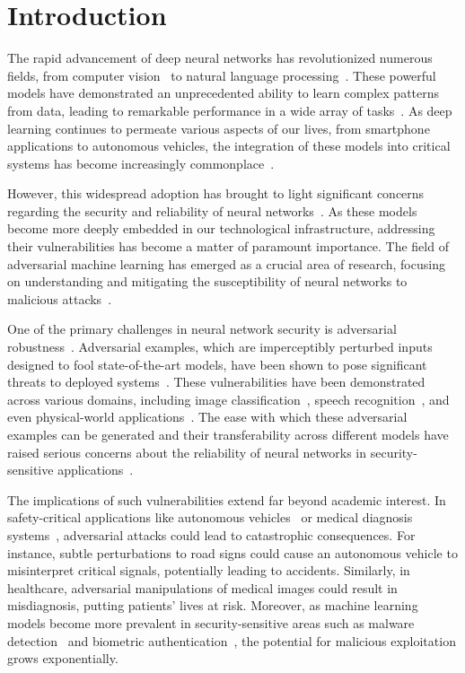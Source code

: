 \section{Introduction}\label{sec:introduction}
The rapid advancement of deep neural networks has revolutionized numerous fields, from computer vision~\cite{krizhevsky2012imagenet} to natural language processing~\cite{devlin2018bert}.
These powerful models have demonstrated an unprecedented ability to learn complex patterns from data, leading to remarkable performance in a wide array of tasks~\cite{lecun2015deep}.
As deep learning continues to permeate various aspects of our lives, from smartphone applications to autonomous vehicles, the integration of these models into critical systems has become increasingly commonplace~\cite{goodfellow2016deep}.

However, this widespread adoption has brought to light significant concerns regarding the security and reliability of neural networks~\cite{biggio2018wild}.
As these models become more deeply embedded in our technological infrastructure, addressing their vulnerabilities has become a matter of paramount importance.
The field of adversarial machine learning has emerged as a crucial area of research, focusing on understanding and mitigating the susceptibility of neural networks to malicious attacks~\cite{vorobeychik2018adversarial}.

One of the primary challenges in neural network security is adversarial robustness~\cite{szegedy2013intriguing}.
Adversarial examples, which are imperceptibly perturbed inputs designed to fool state-of-the-art models, have been shown to pose significant threats to deployed systems~\cite{goodfellow2014explaining}.
These vulnerabilities have been demonstrated across various domains, including image classification~\cite{carlini2017towards}, speech recognition~\cite{carlini2018audio}, and even physical-world applications~\cite{kurakin2016adversarial}.
The ease with which these adversarial examples can be generated and their transferability across different models have raised serious concerns about the reliability of neural networks in security-sensitive applications~\cite{papernot2016transferability}.

The implications of such vulnerabilities extend far beyond academic interest.
In safety-critical applications like autonomous vehicles~\cite{eykholt2018robust} or medical diagnosis systems~\cite{finlayson2019adversarial}, adversarial attacks could lead to catastrophic consequences.
For instance, subtle perturbations to road signs could cause an autonomous vehicle to misinterpret critical signals, potentially leading to accidents.
Similarly, in healthcare, adversarial manipulations of medical images could result in misdiagnosis, putting patients' lives at risk.
Moreover, as machine learning models become more prevalent in security-sensitive areas such as malware detection~\cite{grosse2017adversarial} and biometric authentication~\cite{sharif2016accessorize}, the potential for malicious exploitation grows exponentially.

